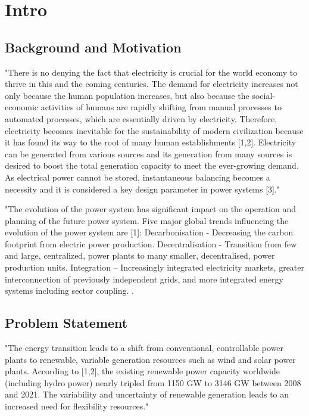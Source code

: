 \section{Intro}

\subsection{Background and Motivation}

"There is no denying the fact that electricity is crucial for the world economy to thrive in this and the coming centuries. The demand for electricity increases not only because the human population increases, but also because the social-economic activities of humans are rapidly shifting from manual processes to automated processes, which are essentially driven by electricity. Therefore, electricity becomes inevitable for the sustainability of modern civilization because it has found its way to the root of many human establishments [1,2]. Electricity can be generated from various sources and its generation from many sources is desired to boost the total generation capacity to meet the ever-growing demand. As electrical power cannot be stored, instantaneous balancing becomes a necessity and it is considered a key design parameter in power systems [3]." \cite{salman_review_2022}

"The evolution of the power system has significant impact on the operation and planning of the future power system. Five major global trends influencing the evolution of the power system are [1]: Decarbonisation - Decreasing the carbon footprint from electric power production. Decentralisation - Transition from few and large, centralized, power plants to many smaller, decentralised, power production units. Integration – Increasingly integrated electricity markets, greater interconnection of previously independent grids, and more integrated energy systems including sector coupling. \cite{emil_hillberg_flexibility_2019}.


\subsection{Problem Statement}
"The energy transition leads to a shift from conventional, controllable power plants to renewable, variable generation resources such as wind and solar power plants. According to [1,2], the existing renewable power capacity worldwide (including hydro power) nearly tripled from 1150 GW to 3146 GW between 2008 and 2021. The variability and uncertainty of renewable generation leads to an increased need for flexibility resources." \cite{lechl_review_2023}




